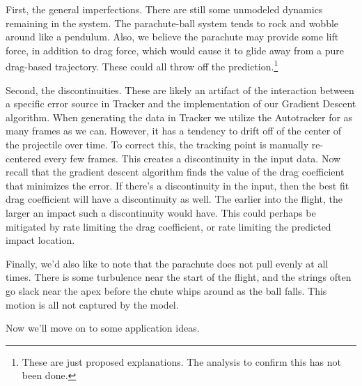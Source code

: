 First, the general imperfections. There are still some unmodeled dynamics remaining in the system. The parachute-ball system tends to rock and wobble around like a pendulum. Also, we believe the parachute may provide some lift force, in addition to drag force, which would cause it to glide away from a pure drag-based trajectory. These could all throw off the prediction.\footnote{These are just proposed explanations. The analysis to confirm this has not been done.} 

Second, the discontinuities. These are likely an artifact of the interaction between a specific error source in Tracker and the implementation of our Gradient Descent algorithm. When generating the data in Tracker we utilize the Autotracker for as many frames as we can. However, it has a tendency to drift off of the center of the projectile over time. To correct this, the tracking point is manually re-centered every few frames. This creates a discontinuity in the input data. Now recall that the gradient descent algorithm finds the value of the drag coefficient that minimizes the error. If there's a discontinuity in the input, then the best fit drag coefficient will have a discontinuity as well. The earlier into the flight, the larger an impact such a discontinuity would have. This could perhaps be mitigated by rate limiting the drag coefficient, or rate limiting the predicted impact location. 

Finally, we'd also like to note that the parachute does not pull evenly at all times. There is some turbulence near the start of the flight, and the strings often go slack near the apex before the chute whips around as the ball falls. This motion is all not captured by the model. 

Now we'll move on to some application ideas.
